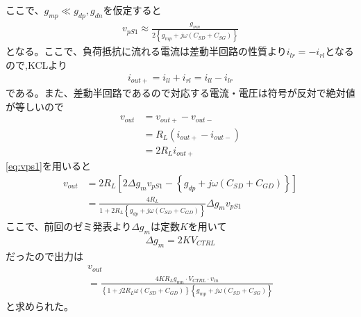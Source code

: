 \documentclass[twocolumn]{jsarticle}
\begin{document}
    ここで、$g_{mp}\ll g_{dp},g_{dn}$を仮定すると
    \begin{align}
        v_{pS1} \approx \frac{g_{mn}}{ 2\left\{ g_{mp}+j\omega(C_{SD}+C_{SG}) \right\} }    \label{eq:vps1}
    \end{align}
    となる。ここで、負荷抵抗に流れる電流は差動半回路の性質より$i_{lr}=-i_{rl}$となるので,KCLより
    \begin{align*}
        i_{out+}=i_{ll}+i_{rl}=i_{ll}-i_{lr}
    \end{align*}
    である。また、差動半回路であるので対応する電流・電圧は符号が反対で絶対値が等しいので
    \begin{align*}
        v_{out} &= v_{out+}-v_{out-}    \\
        &=R_{L}(i_{out+}-i_{out-})      \\
        &= 2R_{L}i_{out+}
    \end{align*}
    \eqref{eq:vps1}を用いると
    \begin{align*}
        v_{out} &= 2R_{L} \left[ 2\Delta g_{m}v_{pS1}- \left\{ g_{dp} + j\omega (C_{SD} + C_{GD}) \right\} \right]    \\
        &= \frac{4R_{L}}{ 1+2R_{L}\left\{ g_{dp} + j\omega(C_{SD}+C_{GD}) \right\} } \Delta g_{m}v_{pS1}
    \end{align*}
    ここで、前回のゼミ発表より$\Delta g_{m}$は定数$K$を用いて
    \begin{align*}
        \Delta g_{m} = 2KV_{CTRL}
    \end{align*}
    だったので出力は
    \begin{multline}
        v_{out} \\
        = \frac{4KR_{L}g_{mn}\cdot V_{CTRL}\cdot v_{in}}{ \left\{ 1+j2R_{L}\omega(C_{SD}+C_{GD}) \right\}\left\{ g_{mp}+j\omega(C_{SD}+C_{SG}) \right\} }    \label{eq:vout}
    \end{multline}
    と求められた。
\end{document}
